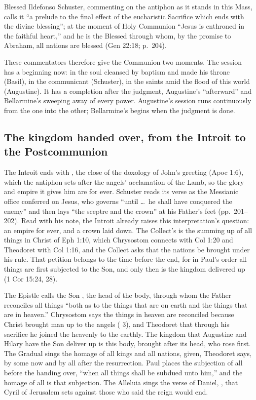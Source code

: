 Blessed Ildefonso Schuster, commenting on the antiphon as it stands in this
Mass, calls it ``a prelude to the final effect of the eucharistic Sacrifice
which ends with the divine blessing''; at the moment of Holy Communion ``Jesus is
enthroned in the faithful heart,'' and he is the Blessed through whom, by the
promise to Abraham, all nations are blessed (Gen 22:18; p.~204).

These commentators therefore give the Communion two moments. The session has a
beginning now: in the soul cleansed by baptism and made his throne (Basil), in
the communicant (Schuster), in the saints amid the flood of this world
(Augustine). It has a completion after the judgment, Augustine's
``afterward'' and Bellarmine's sweeping away of every power. Augustine's
session runs continuously from the one into the other; Bellarmine's begins
when the judgment is done.

\subsection{The kingdom handed over, from the Introit to the Postcommunion}
\label{sec:handed-elements}

The Introit ends with , the close of the doxology
of John's greeting (Apoc 1:6), which the antiphon sets after the angels'
acclamation of the Lamb, so the glory and empire it gives him are for ever.
Schuster reads its verse as the Messianic office conferred on Jesus, who
governs ``until \dots\ he shall have conquered the enemy'' and then lays ``the
sceptre and the crown'' at his Father's feet (pp.~201--202). Read with his
note, the Introit already raises this interpretation's question: an empire for
ever, and a crown laid down. The
Collect's  is the summing up of all things in Christ
of Eph 1:10, which Chrysostom connects with Col 1:20 and Theodoret with Col
1:16, and the Collect asks that the nations be brought under his rule. That
petition belongs to the time before the end, for in Paul's order all things
are first subjected to the Son, and only then is the kingdom delivered up
(1 Cor 15:24, 28).

The Epistle calls the Son , the head of the
body, through whom the Father reconciles all things ``both as to the things
that are on earth and the things that are in heaven.'' Chrysostom says the
things in heaven are reconciled because Christ brought man up to the angels
( 3), and Theodoret that through his sacrifice he
joined the heavenly to the earthly. The kingdom that Augustine and Hilary have
the Son deliver up is this body, brought after its head, who rose first. The
Gradual sings the homage of all kings and all nations, given, Theodoret says,
by some now and by all after the resurrection. Paul places the subjection of
all before the handing over, ``when all things shall be subdued unto him,''
and the homage of all is that subjection. The Alleluia sings the verse of Daniel,
, that Cyril of Jerusalem sets
against those who said the reign would end.

